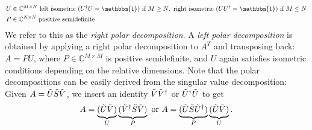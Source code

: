 \noindent {} \vspace{-0.75em} 
\begin{align}
\begin{split}
	& U \in \mathbb{C}^{M \times N} \text{ left isometric } (U^{\dagger}U = \mathbbm{1}) \text{ if } M \geq N, \text{ right isometric } (UU^{\dagger} = \mathbbm{1}) \text{ if } M \leq N \\
	& P \in \mathbb{C}^{N \times N} \text{ positive semidefinite }
\end{split}
\end{align}
We refer to this as the \textit{right polar decomposition}. A \textit{left polar decomposition} is obtained by applying a right polar decomposition to $A^T$ and transposing back: $A = PU$, where $P \in \mathbb{C}^{M \times M}$ is positive semidefinite, and $U$ again satisfies isometric conditions depending on the relative dimensions. Note that the polar decompositions can be easily derived from the singular value decomposition: Given $A = \Tilde{U} \Tilde{S} \Tilde{V}$, we insert an identity $\Tilde{V} \Tilde{V}^{\dagger}$ or $\Tilde{U}^{\dagger} \Tilde{U}$ to get 
\begin{equation}
	A = \underbrace{(\Tilde{U} \Tilde{V})}_{U} \underbrace{(\Tilde{V}^{\dagger} \Tilde{S} \Tilde{V})}_{P} 
	\text{ or } 
	A = \underbrace{(\Tilde{U} \Tilde{S} \Tilde{U}^{\dagger})}_{P} \underbrace{(\Tilde{U} \Tilde{V})}_{U}.
\end{equation}

\vspace*{2em}

